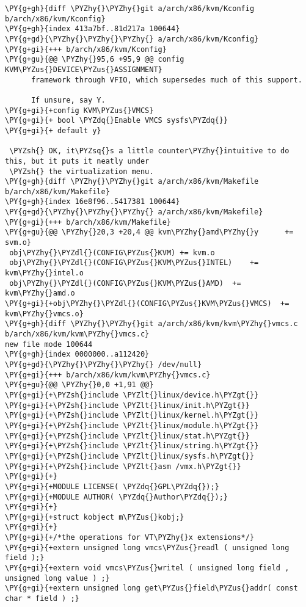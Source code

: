 \begin{Verbatim}[commandchars=\\\{\}]
\PY{g+gh}{diff \PYZhy{}\PYZhy{}git a/arch/x86/kvm/Kconfig b/arch/x86/kvm/Kconfig}
\PY{g+gh}{index 413a7bf..81d217a 100644}
\PY{g+gd}{\PYZhy{}\PYZhy{}\PYZhy{} a/arch/x86/kvm/Kconfig}
\PY{g+gi}{+++ b/arch/x86/kvm/Kconfig}
\PY{g+gu}{@@ \PYZhy{}95,6 +95,9 @@ config KVM\PYZus{}DEVICE\PYZus{}ASSIGNMENT}
 	  framework through VFIO, which supersedes much of this support.
 
 	  If unsure, say Y.
\PY{g+gi}{+config KVM\PYZus{}VMCS}
\PY{g+gi}{+	bool \PYZdq{}Enable VMCS sysfs\PYZdq{}}
\PY{g+gi}{+	default y}
 
 \PYZsh{} OK, it\PYZsq{}s a little counter\PYZhy{}intuitive to do this, but it puts it neatly under
 \PYZsh{} the virtualization menu.
\PY{g+gh}{diff \PYZhy{}\PYZhy{}git a/arch/x86/kvm/Makefile b/arch/x86/kvm/Makefile}
\PY{g+gh}{index 16e8f96..5417381 100644}
\PY{g+gd}{\PYZhy{}\PYZhy{}\PYZhy{} a/arch/x86/kvm/Makefile}
\PY{g+gi}{+++ b/arch/x86/kvm/Makefile}
\PY{g+gu}{@@ \PYZhy{}20,3 +20,4 @@ kvm\PYZhy{}amd\PYZhy{}y		+= svm.o}
 obj\PYZhy{}\PYZdl{}(CONFIG\PYZus{}KVM)	+= kvm.o
 obj\PYZhy{}\PYZdl{}(CONFIG\PYZus{}KVM\PYZus{}INTEL)	+= kvm\PYZhy{}intel.o
 obj\PYZhy{}\PYZdl{}(CONFIG\PYZus{}KVM\PYZus{}AMD)	+= kvm\PYZhy{}amd.o
\PY{g+gi}{+obj\PYZhy{}\PYZdl{}(CONFIG\PYZus{}KVM\PYZus{}VMCS)  += kvm\PYZhy{}vmcs.o}
\PY{g+gh}{diff \PYZhy{}\PYZhy{}git a/arch/x86/kvm/kvm\PYZhy{}vmcs.c b/arch/x86/kvm/kvm\PYZhy{}vmcs.c}
new file mode 100644
\PY{g+gh}{index 0000000..a112420}
\PY{g+gd}{\PYZhy{}\PYZhy{}\PYZhy{} /dev/null}
\PY{g+gi}{+++ b/arch/x86/kvm/kvm\PYZhy{}vmcs.c}
\PY{g+gu}{@@ \PYZhy{}0,0 +1,91 @@}
\PY{g+gi}{+\PYZsh{}include \PYZlt{}linux/device.h\PYZgt{}}
\PY{g+gi}{+\PYZsh{}include \PYZlt{}linux/init.h\PYZgt{}}
\PY{g+gi}{+\PYZsh{}include \PYZlt{}linux/kernel.h\PYZgt{}}
\PY{g+gi}{+\PYZsh{}include \PYZlt{}linux/module.h\PYZgt{}}
\PY{g+gi}{+\PYZsh{}include \PYZlt{}linux/stat.h\PYZgt{}}
\PY{g+gi}{+\PYZsh{}include \PYZlt{}linux/string.h\PYZgt{}}
\PY{g+gi}{+\PYZsh{}include \PYZlt{}linux/sysfs.h\PYZgt{}}
\PY{g+gi}{+\PYZsh{}include \PYZlt{}asm /vmx.h\PYZgt{}}
\PY{g+gi}{+}
\PY{g+gi}{+MODULE LICENSE( \PYZdq{}GPL\PYZdq{});}
\PY{g+gi}{+MODULE AUTHOR( \PYZdq{}Author\PYZdq{});}
\PY{g+gi}{+}
\PY{g+gi}{+struct kobject m\PYZus{}kobj;}
\PY{g+gi}{+}
\PY{g+gi}{+/*the operations for VT\PYZhy{}x extensions*/}
\PY{g+gi}{+extern unsigned long vmcs\PYZus{}readl ( unsigned long field );}
\PY{g+gi}{+extern void vmcs\PYZus{}writel ( unsigned long field , unsigned long value ) ;}
\PY{g+gi}{+extern unsigned long get\PYZus{}field\PYZus{}addr( const char * field ) ;}

\end{Verbatim}
